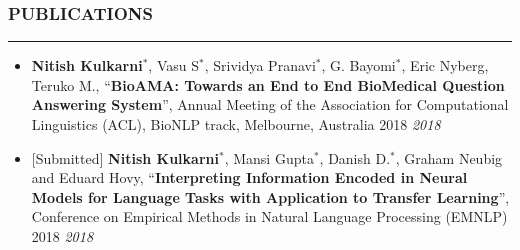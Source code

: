 \documentclass[10pt,a4paper,English]{article}
\newcommand\roottitle[1]{\vspace{-4mm}\subsubsection*{\uppercase{#1}}\vspace{-0.3em}\nopagebreak[4]\hrule\vspace{4mm}}
\newcommand\itemyear[1]{\hfill \emph{\color{itemyear} #1}}
\begin{document}
\roottitle{Publications}
\begin{itemize}[align=left, leftmargin=1em, itemindent=0mm, labelsep=0pt, labelwidth=1em]
    \vspace{-1.5mm}
    \item \textbf{Nitish Kulkarni}$^*$, Vasu S$^*$, Srividya Pranavi$^*$, G. Bayomi$^*$, Eric Nyberg, Teruko M., ``\textbf{BioAMA: Towards an End to End BioMedical Question Answering System}'', Annual Meeting of the Association for Computational Linguistics  (ACL), BioNLP track, Melbourne, Australia 2018 \itemyear{2018}
    \item $\lbrack$Submitted$\rbrack$ \textbf{Nitish Kulkarni}$^*$, Mansi Gupta$^*$, Danish D.$^*$, Graham Neubig and Eduard Hovy, ``\textbf{Interpreting Information Encoded in Neural Models for Language Tasks with Application to Transfer Learning}'', Conference on Empirical Methods in Natural Language Processing (EMNLP) 2018 \itemyear{2018}
\end{itemize}
\end{document}
